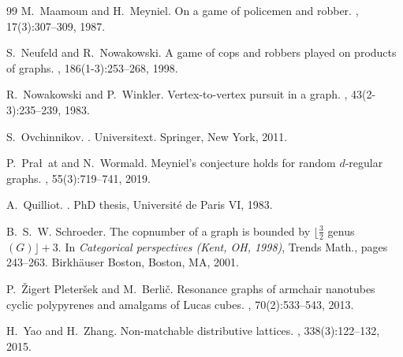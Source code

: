 \documentclass[11pt]{article}
\begin{document}
\begin{thebibliography}{99}
	M.~Maamoun and H.~Meyniel.
	\newblock On a game of policemen and robber.
	, 17(3):307--309, 1987.
	
	S.~Neufeld and R.~Nowakowski.
	\newblock A game of cops and robbers played on products of graphs.
	, 186(1-3):253--268, 1998.
	
	R.~Nowakowski and P.~Winkler.
	\newblock Vertex-to-vertex pursuit in a graph.
	, 43(2-3):235--239, 1983.
	
	S.~Ovchinnikov.
	.
	\newblock Universitext. Springer, New York, 2011.
	
	P.~Pra\l~at and N.~Wormald.
	\newblock Meyniel's conjecture holds for random {$d$}-regular graphs.
	, 55(3):719--741, 2019.
	
	A.~Quilliot.
	.
	\newblock PhD thesis, Université de Paris VI, 1983.
	
	B.~S.~W. Schroeder.
	\newblock The copnumber of a graph is bounded by {$\lfloor\frac 32$} genus
	{$(G)\rfloor+3$}.
	\newblock In {\em Categorical perspectives ({K}ent, {OH}, 1998)}, Trends Math.,
	pages 243--263. Birkh\"auser Boston, Boston, MA, 2001.
	
	P.~\v{Z}igert Pleter\v{s}ek and M.~Berli\v{c}.
	\newblock Resonance graphs of armchair nanotubes cyclic polypyrenes and
	amalgams of {L}ucas cubes.
	, 70(2):533--543, 2013.
	
	H.~Yao and H.~Zhang.
	\newblock Non-matchable distributive lattices.
	, 338(3):122--132, 2015.
	
\end{thebibliography}
\end{document}
